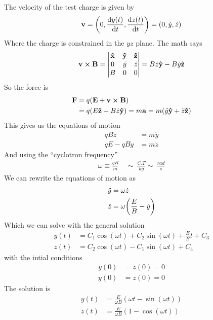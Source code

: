 \documentclass[../main.tex]{subfiles}
\begin{document}
The velocity of the test charge is given by
\begin{align*}
    \vb v = \qt(0, \dv{y(t)}{t}, \dv{z(t)}{t}) = (0, \dot y, \dot z)
\end{align*}
Where the charge is constrained in the $yz$ plane. The math says
\begin{align*}
    \vb v \cross \vb B = \begin{vmatrix}
        \vu x & \vu y & \vu z \\
        0 & \dot y & \dot z \\
        B & 0 & 0
    \end{vmatrix}
    = B \dot z \vu y - B \dot y \vu z
\end{align*}
So the force is
\begin{align*}
    \vb F &= q(\vb E + \vb v \cross \vb B) \\
    &=q (E \vu z + B \dot z \vu y) = m\vb a = m (\ddot y \vu y + \ddot z \vu z)
\end{align*}
This gives us the equations of motion
\begin{align*}
    q B \dot z &= m \ddot y \\
    q E - qB \dot y &= m \ddot z
\end{align*}
And using the ``cyclotron frequency''
\begin{align*}
    \omega \equiv \frac{qB}{m} \quad \sim \qty{}{\frac{C.T}{kg}} \sim \qty{}{\frac{rad}{s}}
\end{align*}
We can rewrite the equations of motion as
\begin{align*}
    \ddot y &= \omega \dot z \\
    \ddot z &= \omega \qt(\frac{E}{B} - \dot y)
\end{align*}
Which we can solve with the general solution
\begin{align*}
    y(t) &= C_1 \cos(\omega t) + C_2 \sin(\omega t) + \frac{E}{B}t + C_3 \\
    z(t) &= C_2 \cos(\omega t) - C_1 \sin(\omega t) + C_4
\end{align*}
with the intial conditions
\begin{align*}
    \dot y(0) &= \dot z(0) = 0 \\
    y(0) &= z(0) = 0
\end{align*}
The solution is
\begin{align*}
    y(t) &= \frac{E}{\omega B} (\omega t - \sin(\omega t)) \\
    z(t) &= \frac{E}{\omega B} (1 - \cos(\omega t))
\end{align*}
\end{document}
